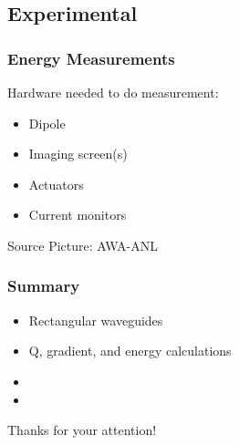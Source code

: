 \documentclass[professionalfonts,t]{beamer}
\begin{document}
\subsection{Experimental}
\begin{frame}
\frametitle{Energy Measurements}
\centering
\vspace{1em}

\begin{minipage}{0.35\textwidth}
Hardware needed to do measurement:
\begin{itemize}
	\item Dipole
	\item Imaging screen(s)
	\item Actuators
	\item Current monitors
\end{itemize}	
\end{minipage}\hfill \hfill
\begin{minipage}{0.6\textwidth}
\end{minipage}

\vspace{1em}
\hfill Source Picture: AWA-ANL
\end{frame}

\begin{frame}
	\frametitle{Summary}
	\begin{itemize}
		\item Rectangular waveguides
		\item Q, gradient, and energy calculations
		\item 
		\item 
	\end{itemize}

	\centering
	\large{Thanks for your attention!}
\end{frame}
\end{document}
